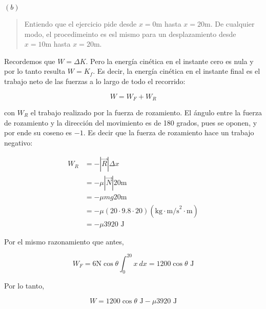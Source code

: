 \documentclass[12pt]{article}
\theoremstyle{definition}
\begin{document}
$(b)$


\small
\begin{quote}

Entiendo que el ejercicio pide desde $x = 0\text{m}$ hasta $x=20\text{m}$. De
cualquier modo, el procedimeinto es esl mismo para un desplazamiento desde 
$x = 10\text{m}$ hasta $x=20$m.

\end{quote}
\normalsize


Recordemos que $W = \Delta K$. Pero la energía cinética en el instante
cero es nula y por lo tanto resulta $W = K_f$. Es decir, la energía cinética en
el instante final es el trabajo neto de las fuerzas a lo largo de todo el
recorrido: 

\begin{equation*}
    W = W_F + W_R
\end{equation*}

con $W_R$ el trabajo realizado por la fuerza de rozamiento. El ángulo entre la
fuerza de rozamiento y la dirección del movimiento es de 180 grados, pues se
oponen, y por ende su coseno es $-1$. Es decir que la fuerza de rozamiento hace un trabajo
negativo:

\begin{align*}
    W_R 
    &= -\left| \vec{R} \right| \Delta x \\ 
    &= - \mu\left| \vec{N} \right| 20\text{m} \\ 
    &= - \mu mg 20\text{m} \\ 
    &= - \mu (20 \cdot 9.8 \cdot 20) (\text{kg} \cdot \text{m/s}^2 \cdot
    \text{m}) \\ 
    &= -\mu 3920 \text{ J}
\end{align*}

Por el mismo razonamiento que antes, 

\begin{equation*}
    W_F = 6\text{N} \cos \theta\int_{0}^{20} x ~ dx = 1200 \cos \theta \text{ J}
\end{equation*}

Por lo tanto, 

\begin{equation*}
    W = 1200 \cos \theta \text{ J} - \mu 3920 \text{ J}
\end{equation*}
\end{document}
